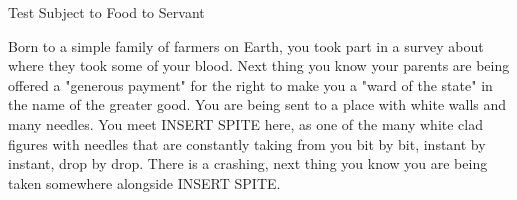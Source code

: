\documentclass[char]{guildcamp4}
\begin{document}
\name{\cPlead{}}

Test Subject to Food to Servant

Born to a simple family of farmers on Earth, you took part in a survey about where they took some of your blood. Next thing you know your parents 
are being offered a "generous payment" for the right to make you a "ward of the state" in the name of the greater good. You are being sent to a place with white walls and many needles. You meet INSERT SPITE  here, as one of the many white clad figures with needles that are constantly taking from you bit by bit, instant by instant, drop by drop. There is a crashing, next thing you know you are being taken somewhere alongside INSERT SPITE.


\begin{itemz}[Goals]
	\item 
\end{itemz}

\begin{itemz}[Notes]
	\item 
\end{itemz}

\end{document}
